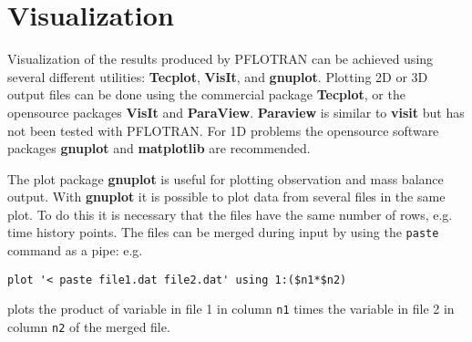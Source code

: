 
\section{Visualization}

Visualization of the results produced by PFLOTRAN can be achieved using several different utilities: {\bf Tecplot}, {\bf VisIt}, and {\bf gnuplot}. Plotting 2D or 3D output files can be done using the commercial package {\bf Tecplot}, or the opensource packages {\bf VisIt} and {\bf ParaView}. {\bf Paraview} is similar to {\bf visit} but has not been tested with PFLOTRAN. For 1D problems the opensource software packages {\bf gnuplot} and {\bf matplotlib} are recommended.

The plot package {\bf gnuplot} is useful for plotting observation and mass balance output. With {\bf gnuplot} it is possible to plot data from several files in the same plot.
To do this it is necessary that the files have the same number of rows, e.g. time history points. The files can be merged during input by using the {\tt paste} command as a pipe: e.g.

\verb|plot '< paste file1.dat file2.dat' using 1:($n1*$n2)|

\noindent
plots the product of variable in file 1 in column {\tt n1} times the variable in file 2 in column {\tt n2} of the merged file.
